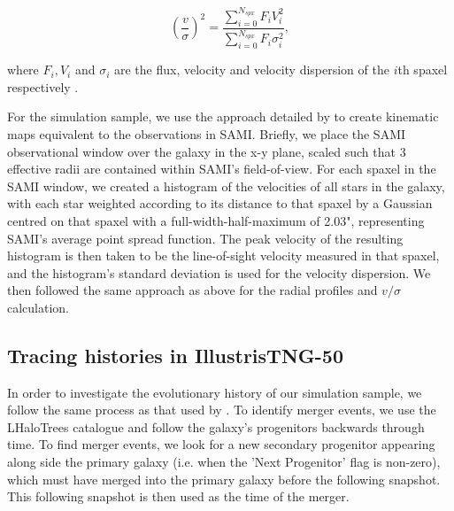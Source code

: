 \documentclass[a4paper,fleqn,usenatbib]{mnras}
\begin{document}
\begin{equation}
\left( \frac{v}{\sigma} \right)^{2} = \frac{\sum_{i=0}^{N_{spx}}{F_{i}{V_{i}^{2}  }}} {\sum_{i=0}^{N_{spx}}{F_{i}\sigma_{i}^{2}}},
\label{refinement_eq}	
\end{equation}

where $F_{i}, V_{i}$ and $\sigma_{i}$ are the flux, velocity and velocity dispersion of the $i$th spaxel respectively \citep{2018NatAs...2..483V}. 

For the simulation sample, we use the approach detailed by \citet{2021MNRAS.508..895D}  \citep[following the method outlined in][]{2019MNRAS.487.2354B} to create kinematic maps equivalent to the observations in SAMI. Briefly, we place the SAMI observational window over the galaxy in the x-y plane, scaled such that 3 effective radii are contained within SAMI's field-of-view. For each spaxel in the SAMI window, we created a histogram of the velocities of all stars in the galaxy, with each star weighted according to its distance to that spaxel by a Gaussian centred on that spaxel with a full-width-half-maximum of 2.03", representing SAMI's average point spread function. The peak velocity of the resulting histogram is then taken to be the line-of-sight velocity measured in that spaxel, and the histogram's standard deviation is used for the velocity dispersion. We then followed the same approach as above for the radial profiles and $v/\sigma$ calculation. 


\subsection{Tracing histories in IllustrisTNG-50}

In order to investigate the evolutionary history of our simulation sample, we follow the same process as that used by \citet{2021MNRAS.508..895D}. To identify merger events, we use the LHaloTrees catalogue \citep{2005Natur.435..629S} and follow the galaxy's progenitors backwards through time. To find merger events, we look for a new secondary progenitor appearing along side the primary galaxy (i.e. when the 'Next Progenitor' flag is non-zero), which must have merged into the primary galaxy before the following snapshot. This following snapshot is then used as the time of the merger.
\end{document}
